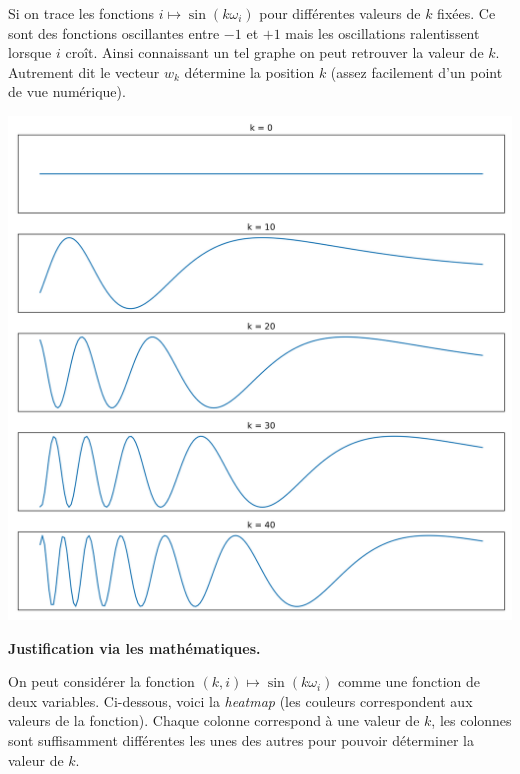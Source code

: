 \documentclass[11pt,class=report,crop=false]{standalone}
\begin{document}
Si on trace les fonctions $i \mapsto \sin( k \omega_i)$ pour différentes valeurs de $k$ fixées. Ce sont des fonctions oscillantes entre $-1$ et $+1$ mais les oscillations ralentissent lorsque $i$ croît. Ainsi connaissant un tel graphe on peut retrouver la valeur de $k$. Autrement dit le vecteur $w_k$ détermine  la position $k$ (assez facilement d'un point de vue numérique).

\begin{center}
	\includegraphics[scale=\myscale,scale=0.4]{figures/position-kcst}
\end{center}

\bigskip

\textbf{Justification via les mathématiques.}

On peut considérer la fonction $(k,i) \mapsto \sin( k \omega_i)$ comme une fonction de deux variables. Ci-dessous, voici la \emph{heatmap} (les couleurs correspondent aux valeurs de la fonction). Chaque colonne correspond à une valeur de $k$, les colonnes sont suffisamment différentes les unes des autres pour pouvoir déterminer la valeur de $k$.
\end{document}
